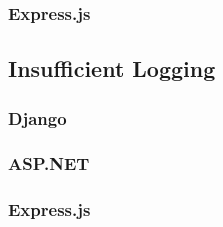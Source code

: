 \subsubsection{Express.js}
\subsection{Insufficient Logging}
\subsubsection{Django}
\subsubsection{ASP.NET}
\subsubsection{Express.js}

